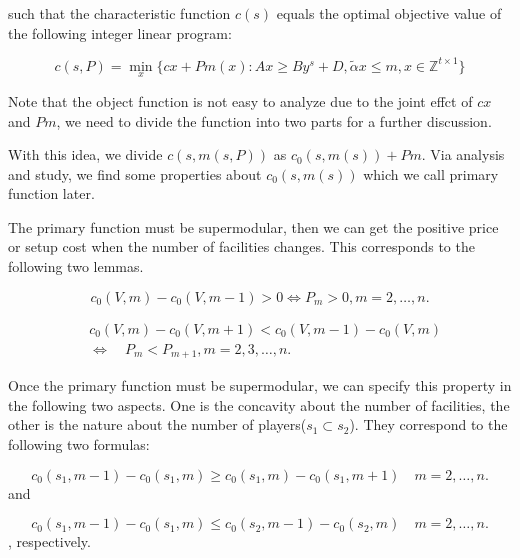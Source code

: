 such that the characteristic function $c(s)$ equals the optimal objective value of the following integer linear program:

\[
c(s,P)= \mathop{\min}_{x} \{ cx+Pm(x): Ax \geq By^s+D, \tilde{\alpha}x \leq m, x \in \mathbb{Z}^{t \times 1} \}
\]

Note that the object function is not easy to analyze due to the joint effct of $cx$ and $Pm$, we need to divide the function into two parts for a further discussion.

With this idea, we divide $c(s,m(s,P))$ as $c_0(s,m(s))+Pm $. Via analysis and study, we find some properties about $c_0(s,m(s)) $ which we call primary function later.

The primary function must be supermodular, then we can get the positive price or setup cost when the number of facilities changes. This corresponds to the following two lemmas.


\begin{lem}\label{lem2}
\[c_0(V,m)- c_0(V,m-1) > 0 \Leftrightarrow P_m > 0, m=2,\ldots,n.\]
\end{lem}

\begin{lem}\label{lem3}
\[
\begin{aligned}
&c_0 (V,m) - c_0 (V,m+1) < c_0 (V,m-1) - c_0 (V,m) \\
&\Leftrightarrow \quad P_m < P_{m+1} , m=2,3,\ldots,n.
\end{aligned}
\]
\end{lem}

Once the primary function must be supermodular, we can specify this property in the following two aspects.
One is the concavity about the number of facilities,
the other is the nature about the number of players($s_1 \subset s_2$).
They correspond to the following two formulas:

\begin{equation}\label{concavity_f}
c_0(s_1,m-1)-c_0(s_1,m) \geq
  c_0(s_1,m)-c_0(s_1,m+1) \quad m=2,\ldots,n.
\end{equation}
and

\begin{equation}\label{property_p}
	c_0(s_1,m-1)-c_0(s_1,m) \leq
	  c_0(s_2,m-1)-c_0(s_2,m) \quad m=2,\ldots,n.
\end{equation}
, respectively.

